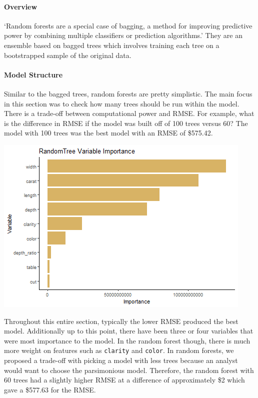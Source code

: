 \documentclass[
  paper=a4,
  ,captions=tableheading
]{scrartcl}
\begin{document}
\hypertarget{overview-3}{%
\paragraph{Overview}\label{overview-3}}

`Random forests are a special case of bagging, a method for improving
predictive power by combining multiple classifiers or prediction
algorithms.' They are an ensemble based on bagged trees which involves
training each tree on a bootstrapped sample of the original data.

\hypertarget{model-structure-1}{%
\paragraph{Model Structure}\label{model-structure-1}}

Similar to the bagged trees, random forests are pretty simplistic. The
main focus in this section was to check how many trees should be run
within the model. There is a trade-off between computational power and
RMSE. For example, what is the difference in RMSE if the model was built
off of 100 trees versus 60? The model with 100 trees was the best model
with an RMSE of \$575.42.

\begin{center}\includegraphics{Diamonds_PDF_files/figure-latex/RF Variable Importance-1} \end{center}

Throughout this entire section, typically the lower RMSE produced the
best model. Additionally up to this point, there have been three or four
variables that were most importance to the model. In the random forest
though, there is much more weight on features such as \texttt{clarity}
and \texttt{color}. In random forests, we proposed a trade-off with
picking a model with less trees because an analyst would want to choose
the parsimonious model. Therefore, the random forest with 60 trees had a
slightly higher RMSE at a difference of approximately \$2 which gave a
\$577.63 for the RMSE.
\end{document}
